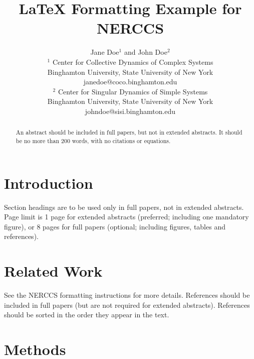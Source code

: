 \documentclass[12pt]{article}
\begin{document}
\title{\normalsize\bf%
LaTeX Formatting Example for NERCCS}

\author{Jane Doe$^1$ and John Doe$^2$\\
$^1$ Center for Collective Dynamics of Complex Systems\\
Binghamton University, State University of New York\\
janedoe@coco.binghamton.edu\\
$^2$ Center for Singular Dynamics of Simple Systems\\
Binghamton University, State University of New York\\
johndoe@sisi.binghamton.edu}

\date{\vspace{-5ex}} %

\maketitle

\thispagestyle{empty}
\pagestyle{empty}

\begin{abstract}\normalsize%
An abstract should be included in full papers, but not in extended abstracts. It should be no more than 200 words, with no citations or equations.
\end{abstract}

\section{Introduction}

Section headings are to be used only in full papers, not in extended abstracts. Page limit is 1 page for extended abstracts (preferred; including one mandatory figure), or 8 pages for full papers (optional; including figures, tables and references).

\section{Related Work}

See the NERCCS formatting instructions \cite{nerccsinstructions} for more details. References should be included in full papers (but are not required for extended abstracts). References should be sorted in the order they appear in the text.

\section{Methods}
\end{document}
